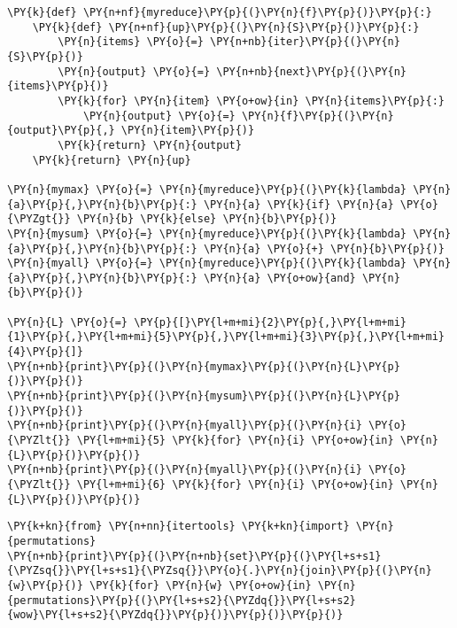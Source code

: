 \begin{Verbatim}[commandchars=\\\{\}]
\PY{k}{def} \PY{n+nf}{myreduce}\PY{p}{(}\PY{n}{f}\PY{p}{)}\PY{p}{:}
    \PY{k}{def} \PY{n+nf}{up}\PY{p}{(}\PY{n}{S}\PY{p}{)}\PY{p}{:}
        \PY{n}{items} \PY{o}{=} \PY{n+nb}{iter}\PY{p}{(}\PY{n}{S}\PY{p}{)}
        \PY{n}{output} \PY{o}{=} \PY{n+nb}{next}\PY{p}{(}\PY{n}{items}\PY{p}{)}
        \PY{k}{for} \PY{n}{item} \PY{o+ow}{in} \PY{n}{items}\PY{p}{:}
            \PY{n}{output} \PY{o}{=} \PY{n}{f}\PY{p}{(}\PY{n}{output}\PY{p}{,} \PY{n}{item}\PY{p}{)}
        \PY{k}{return} \PY{n}{output}
    \PY{k}{return} \PY{n}{up}

\PY{n}{mymax} \PY{o}{=} \PY{n}{myreduce}\PY{p}{(}\PY{k}{lambda} \PY{n}{a}\PY{p}{,}\PY{n}{b}\PY{p}{:} \PY{n}{a} \PY{k}{if} \PY{n}{a} \PY{o}{\PYZgt{}} \PY{n}{b} \PY{k}{else} \PY{n}{b}\PY{p}{)}
\PY{n}{mysum} \PY{o}{=} \PY{n}{myreduce}\PY{p}{(}\PY{k}{lambda} \PY{n}{a}\PY{p}{,}\PY{n}{b}\PY{p}{:} \PY{n}{a} \PY{o}{+} \PY{n}{b}\PY{p}{)}
\PY{n}{myall} \PY{o}{=} \PY{n}{myreduce}\PY{p}{(}\PY{k}{lambda} \PY{n}{a}\PY{p}{,}\PY{n}{b}\PY{p}{:} \PY{n}{a} \PY{o+ow}{and} \PY{n}{b}\PY{p}{)}

\PY{n}{L} \PY{o}{=} \PY{p}{[}\PY{l+m+mi}{2}\PY{p}{,}\PY{l+m+mi}{1}\PY{p}{,}\PY{l+m+mi}{5}\PY{p}{,}\PY{l+m+mi}{3}\PY{p}{,}\PY{l+m+mi}{4}\PY{p}{]}
\PY{n+nb}{print}\PY{p}{(}\PY{n}{mymax}\PY{p}{(}\PY{n}{L}\PY{p}{)}\PY{p}{)}
\PY{n+nb}{print}\PY{p}{(}\PY{n}{mysum}\PY{p}{(}\PY{n}{L}\PY{p}{)}\PY{p}{)}
\PY{n+nb}{print}\PY{p}{(}\PY{n}{myall}\PY{p}{(}\PY{n}{i} \PY{o}{\PYZlt{}} \PY{l+m+mi}{5} \PY{k}{for} \PY{n}{i} \PY{o+ow}{in} \PY{n}{L}\PY{p}{)}\PY{p}{)}
\PY{n+nb}{print}\PY{p}{(}\PY{n}{myall}\PY{p}{(}\PY{n}{i} \PY{o}{\PYZlt{}} \PY{l+m+mi}{6} \PY{k}{for} \PY{n}{i} \PY{o+ow}{in} \PY{n}{L}\PY{p}{)}\PY{p}{)}
\end{Verbatim}


\begin{Verbatim}[commandchars=\\\{\}]
\PY{k+kn}{from} \PY{n+nn}{itertools} \PY{k+kn}{import} \PY{n}{permutations}
\PY{n+nb}{print}\PY{p}{(}\PY{n+nb}{set}\PY{p}{(}\PY{l+s+s1}{\PYZsq{}}\PY{l+s+s1}{\PYZsq{}}\PY{o}{.}\PY{n}{join}\PY{p}{(}\PY{n}{w}\PY{p}{)} \PY{k}{for} \PY{n}{w} \PY{o+ow}{in} \PY{n}{permutations}\PY{p}{(}\PY{l+s+s2}{\PYZdq{}}\PY{l+s+s2}{wow}\PY{l+s+s2}{\PYZdq{}}\PY{p}{)}\PY{p}{)}\PY{p}{)}
\end{Verbatim}

